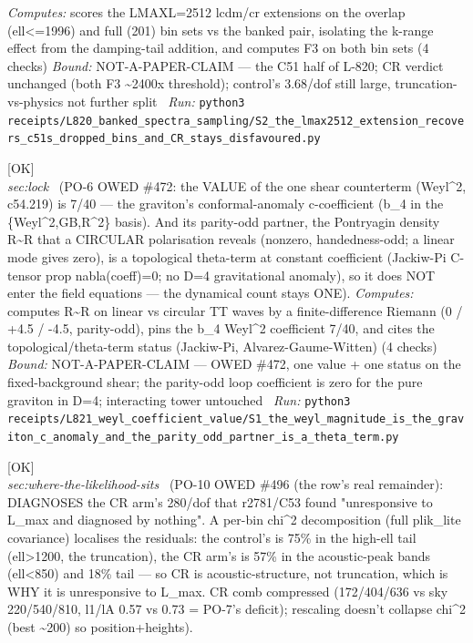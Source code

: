 \begin{description}
\emph{Computes:} scores the LMAXL=2512 lcdm/cr extensions on the overlap (ell<=1996) and full (201) bin sets vs the banked pair, isolating the k-range effect from the damping-tail addition, and computes F3 on both bin sets (4 checks)
 \emph{Bound:} NOT-A-PAPER-CLAIM --- the C51 half of L-820; CR verdict unchanged (both F3 \textasciitilde{}2400x threshold); control's 3.68/dof still large, truncation-vs-physics not further split
\ \emph{Run:} \texttt{python3 receipts/L820\_banked\_spectra\_sampling/S2\_the\_lmax2512\_extension\_recovers\_c51s\_dropped\_bins\_and\_CR\_stays\_disfavoured.py}
\item[\label{rcpt:S1_the_weyl_magnitude_is_the_graviton_c_anomaly_and_the_parity_odd_partner_is_a_theta_term}\texttt{S1\_the\_weyl\_magnitude\_is\_the\_graviton\_c\_anomaly\_and\_the\_parity\_odd\_partner\_is\_a\_theta\_term}]\hfill\textsf{[OK]}\\
\textit{sec:lock} \ (PO-6 OWED \#472: the VALUE of the one shear counterterm (Weyl\textasciicircum{}2, c54.219) is 7/40 --- the graviton's conformal-anomaly c-coefficient (b\_4 in the \{Weyl\textasciicircum{}2,GB,R\textasciicircum{}2\} basis). And its parity-odd partner, the Pontryagin density R\textasciitilde{}R that a CIRCULAR polarisation reveals (nonzero, handedness-odd; a linear mode gives zero), is a topological theta-term at constant coefficient (Jackiw-Pi C-tensor prop nabla(coeff)=0; no D=4 gravitational anomaly), so it does NOT enter the field equations --- the dynamical count stays ONE). 
\emph{Computes:} computes R\textasciitilde{}R on linear vs circular TT waves by a finite-difference Riemann (0 / +4.5 / -4.5, parity-odd), pins the b\_4 Weyl\textasciicircum{}2 coefficient 7/40, and cites the topological/theta-term status (Jackiw-Pi, Alvarez-Gaume-Witten) (4 checks)
 \emph{Bound:} NOT-A-PAPER-CLAIM --- OWED \#472, one value + one status on the fixed-background shear; the parity-odd loop coefficient is zero for the pure graviton in D=4; interacting tower untouched
\ \emph{Run:} \texttt{python3 receipts/L821\_weyl\_coefficient\_value/S1\_the\_weyl\_magnitude\_is\_the\_graviton\_c\_anomaly\_and\_the\_parity\_odd\_partner\_is\_a\_theta\_term.py}
\item[\label{rcpt:S1_the_cr_residual_is_acoustic_structure_not_truncation_and_that_is_why_it_is_unresponsive_to_lmax}\texttt{S1\_the\_cr\_residual\_is\_acoustic\_structure\_not\_truncation\_and\_that\_is\_why\_it\_is\_unresponsive\_to\_lmax}]\hfill\textsf{[OK]}\\
\textit{sec:where-the-likelihood-sits} \ (PO-10 OWED \#496 (the row's real remainder): DIAGNOSES the CR arm's 280/dof that r2781/C53 found "unresponsive to L\_max and diagnosed by nothing". A per-bin chi\textasciicircum{}2 decomposition (full plik\_lite covariance) localises the residuals: the control's is 75\% in the high-ell tail (ell>1200, the truncation), the CR arm's is 57\% in the acoustic-peak bands (ell<850) and 18\% tail --- so CR is acoustic-structure, not truncation, which is WHY it is unresponsive to L\_max. CR comb compressed (172/404/636 vs sky 220/540/810, l1/lA 0.57 vs 0.73 = PO-7's deficit); rescaling doesn't collapse chi\textasciicircum{}2 (best \textasciitilde{}200) so position+heights). 

\end{description}

